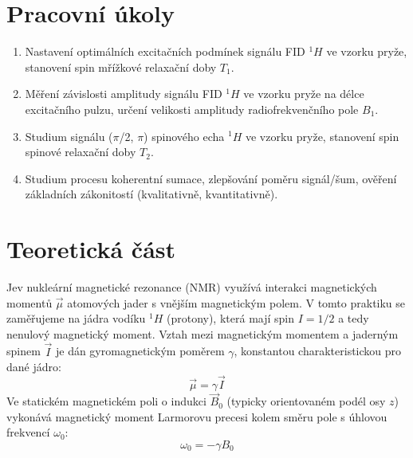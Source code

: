 \section{Pracovní úkoly}

\begin{enumerate}
\item Nastavení optimálních excitačních podmínek signálu FID $^1H$ ve vzorku pryže, stanovení spin mřížkové relaxační doby $T_1$.

\item Měření závislosti amplitudy signálu FID $^1H$ ve vzorku pryže na délce excitačního pulzu, určení velikosti amplitudy radiofrekvenčního pole $B_1$.

\item Studium signálu ($\pi$/2, $\pi$) spinového echa $^1H$ ve vzorku pryže, stanovení spin spinové relaxační doby $T_2$.

\item Studium procesu koherentní sumace, zlepšování poměru signál/šum, ověření základních zákonitostí (kvalitativně, kvantitativně).
\end{enumerate}

\section{Teoretická část}
Jev nukleární magnetické rezonance (NMR) využívá interakci magnetických momentů $\vec{\mu}$ atomových jader s vnějším magnetickým polem. V tomto praktiku se zaměřujeme na jádra vodíku ${}^{1}H$ (protony), která mají spin $I=1/2$ a tedy nenulový magnetický moment. Vztah mezi magnetickým momentem a jaderným spinem $\vec{I}$ je dán gyromagnetickým poměrem $\gamma$, konstantou charakteristickou pro dané jádro:
\begin{equation} \label{eq:mu_gamma_I}
\vec{\mu} = \gamma \vec{I} \tag{3}
\end{equation}
Ve statickém magnetickém poli o indukci $\vec{B}_0$ (typicky orientovaném podél osy $z$) vykonává magnetický moment Larmorovu precesi kolem směru pole s úhlovou frekvencí $\omega_0$:
\begin{equation} \label{eq:larmor}
\omega_0 = -\gamma B_0 \tag{6}
\end{equation}


